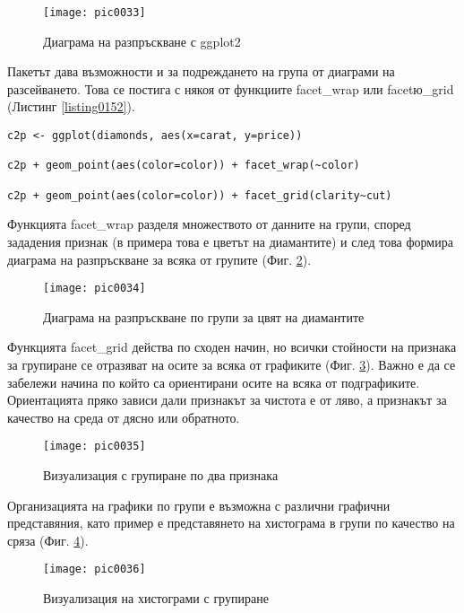 \begin{figure}[h!]
  \centering
  \texttt{[image: pic0033]}
  \caption{Диаграма на разпръскване с ggplot2}
\label{figure0033}
\end{figure}
\FloatBarrier

Пакетът дава възможности и за подреждането на група от диаграми на разсейването. Това се постига с някоя от функциите facet\_wrap или facetю\_grid (Листинг \ref{listing0152}). 

\begin{lstlisting}[caption=Диаграма на разпръскване групирани по признак, label=listing0152]
c2p <- ggplot(diamonds, aes(x=carat, y=price))

c2p + geom_point(aes(color=color)) + facet_wrap(~color)

c2p + geom_point(aes(color=color)) + facet_grid(clarity~cut)
\end{lstlisting}

Функцията facet\_wrap разделя множеството от данните на групи, според зададения признак (в примера това е цветът на диамантите) и след това формира диаграма на разпръскване за всяка от групите (Фиг. \ref{figure0034}).

\begin{figure}[h!]
  \centering
  \texttt{[image: pic0034]}
  \caption{Диаграма на разпръскване по групи за цвят на диамантите}
\label{figure0034}
\end{figure}
\FloatBarrier

Функцията facet\_grid действа по сходен начин, но всички стойности на признака за групиране се отразяват на осите за всяка от графиките (Фиг. \ref{figure0035}). Важно е да се забележи начина по който са ориентирани осите на всяка от подграфиките. Ориентацията пряко зависи дали признакът за чистота е от ляво, а признакът за качество на среда от дясно или обратното. 

\begin{figure}[h!]
  \centering
  \texttt{[image: pic0035]}
  \caption{Визуализация с групиране по два признака}
\label{figure0035}
\end{figure}
\FloatBarrier

Организацията на графики по групи е възможна с различни графични представяния, като пример е представянето на хистограма в групи по качество на сряза (Фиг. \ref{figure0036}).

\begin{figure}[h!]
  \centering
  \texttt{[image: pic0036]}
  \caption{Визуализация на хистограми с групиране}
\label{figure0036}
\end{figure}
\FloatBarrier

